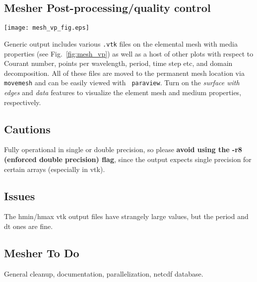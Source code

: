 \documentclass[11pt,letter,fleqn,english,notitlepage]{article}
\begin{document}
\subsection{Mesher Post-processing/quality control }
\begin{figure*}[htb]
    \begin{center}\label{fig:mesh_vp}
        \texttt{[image: mesh\_vp\_fig.eps]}
        \caption{\textit{The elemental mesh (blue lines) for IASP91 at 20
        seconds superimposed on the $v_p$ velocity.  The plot is derived
        straight from the file {\tt mesh\_vp.vtk} produced by the mesher. Zoom
        sections of the central region and crust/upper mantle are added to
        highlight the topological features.}}
    \end{center}
\end{figure*}
%
\noindent Generic output includes various {\tt *.vtk} files on the elemental
mesh with media properties (see Fig.~\ref{fig:mesh_vp}) as well as a host of
other plots with respect to Courant number, points per wavelength, period, time
step etc, and domain decomposition.  All of these files are moved to the
permanent mesh location via {\tt movemesh} and can be easily viewed with {\tt
paraview}. Turn on the \textit{surface with edges} and \textit{data} features
to visualize the element mesh and medium properties, respectively.

\subsection{Cautions}
Fully operational in single or double precision, so please \textbf{avoid using
the -r8 (enforced double precision) flag}, since the output expects single
precision for certain arrays (especially in vtk).

\subsection{Issues}
The hmin/hmax vtk output files have strangely large values, but the period and
dt ones are fine.

\subsection{Mesher To Do}
General cleanup, documentation, parallelization, netcdf database.

\newpage
\end{document}
